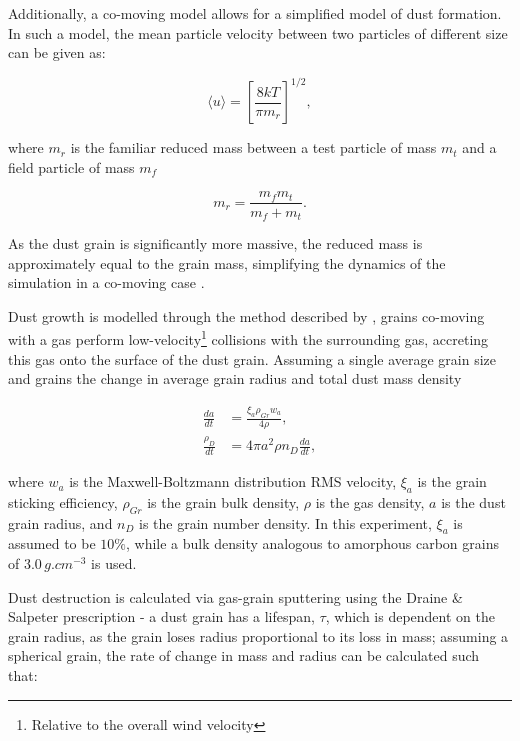Additionally, a co-moving model allows for a simplified model of dust formation. In such a model, the mean particle velocity between two particles of different size can be given as:

\begin{equation}
  \langle u \rangle = \left[ \frac{8kT}{\pi m_r} \right] ^{1/2} ,
\end{equation}

where $m_r$ is the familiar reduced mass between a test particle of mass $m_t$ and a field particle of mass $m_f$

\begin{equation}
  m_r = \frac{m_f m_t}{m_f + m_t} .
\end{equation}

As the dust grain is significantly more massive, the reduced mass is approximately equal to the grain mass, simplifying the dynamics of the simulation in a co-moving case \cite{spitzer_jr._physical_2008}.

Dust growth is modelled through the method described by \cite{spitzer_jr._physical_2008}, grains co-moving with a gas perform low-velocity\footnote{Relative to the overall wind velocity} collisions with the surrounding gas, accreting this gas onto the surface of the dust grain. Assuming a single average grain size and grains  the change in average grain radius and total dust mass density

\begin{subequations}
  \begin{align}
        \frac{da}{dt} & = \frac{\xi_a \rho_{Gr} w_a}{4 \rho} , \\
    \frac{\rho_D}{dt} & = 4 \pi a^2 \rho n_D \frac{da}{dt}   , 
  \end{align}
\end{subequations}

where $w_a$ is the Maxwell-Boltzmann distribution RMS velocity, $\xi_a$ is the grain sticking efficiency, $\rho_{Gr}$ is the grain bulk density, $\rho$ is the gas density, $a$ is the dust grain radius, and $n_D$ is the grain number density. In this experiment, $\xi_a$ is assumed to be $10\%$, while a bulk density analogous to amorphous carbon grains of $3.0 \, \si{g.cm^{-3}}$ is used.

Dust destruction is calculated via gas-grain sputtering using the Draine \& Salpeter prescription - a dust grain has a lifespan, $\tau$, which is dependent on the grain radius, as the grain loses radius proportional to its loss in mass; assuming a spherical grain, the rate of change in mass and radius can be calculated such that:

